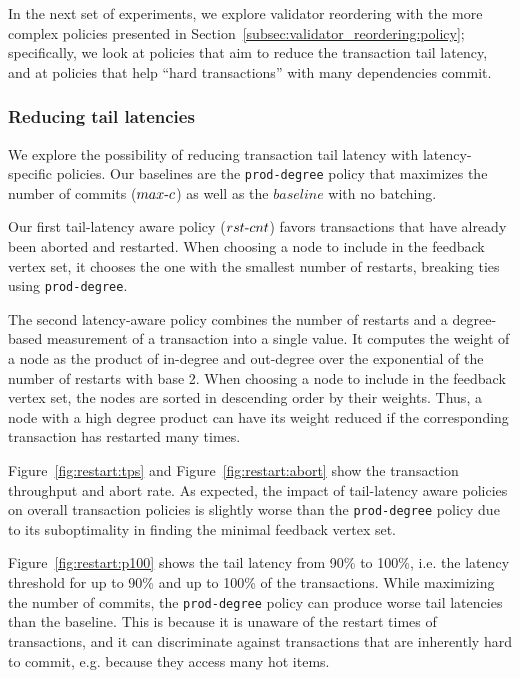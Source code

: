 In the next set of experiments, we explore validator reordering with the more complex policies presented in Section~\ref{subsec:validator_reordering:policy}; specifically, we look at policies that aim to reduce the transaction tail latency, and at policies that help ``hard transactions'' with many dependencies commit.


\subsubsection{Reducing tail latencies}

We explore the possibility of reducing transaction tail latency with latency-specific policies. Our baselines are the \texttt{prod-degree} policy that maximizes the number of commits ($max\hbox{-}c$) as well as the $baseline$ with no batching. 

Our first tail-latency aware policy ($rst\hbox{-}cnt$) favors transactions that have already been aborted and restarted. When choosing a node to include in the feedback vertex set, it chooses the one with the smallest number of restarts, breaking ties using \texttt{prod-degree}.

The second latency-aware policy combines the number of restarts and a degree-based measurement of a transaction into a single value. It computes the weight of a node as the product of in-degree and out-degree over the exponential of the number of restarts with base 2. When choosing a node to include in the feedback vertex set, the nodes are sorted in descending order by their weights. Thus, a node with a high degree product can have its weight reduced if the corresponding transaction has restarted many times.

Figure~\ref{fig:restart:tps} and Figure~\ref{fig:restart:abort} show the transaction throughput and abort rate. As expected, the impact of tail-latency aware policies on overall transaction policies is slightly worse than the \texttt{prod-degree} policy due to its suboptimality in finding the minimal feedback vertex set.

Figure~\ref{fig:restart:p100} shows the tail latency from 90\% to 100\%, i.e. the latency threshold for up to 90\% and up to 100\% of the transactions. While maximizing the number of commits, the \texttt{prod-degree} policy can produce worse tail latencies than the baseline. This is because it is unaware of the restart times of transactions, and it can discriminate against transactions that are inherently hard to commit, e.g. because they access many hot items.

